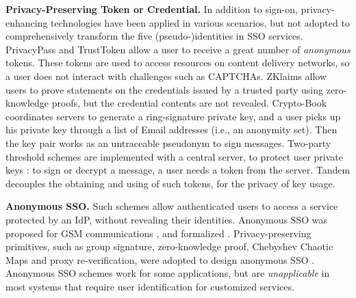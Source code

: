 \noindent\textbf{Privacy-Preserving Token or Credential.}
%
In addition to sign-on, privacy-enhancing technologies have been applied in various scenarios,
  but not adopted to comprehensively transform the five (pseudo-)identities in SSO services.
PrivacyPass and TrustToken \cite{privacypass,trusttoken} allow a user to receive a great number of \emph{anonymous} tokens.
 These tokens are used to access resources on content delivery networks,
    so a user does not interact with challenges such as CAPTCHAs.
ZKlaims \cite{zklaim} allow users to prove statements on the credentials issued by a trusted party
    using zero-knowledge proofs,
        but the credential contents are not revealed.
Crypto-Book \cite{crypto-book} coordinates servers to generate a ring-signature private key,
 and a user picks up his private key through a list of Email addresses (i.e., an anonymity set).
 Then the key pair works as an untraceable pseudonym to sign messages.
Two-party threshold schemes are implemented with a central server,
    to protect user private keys \cite{mRSA,ss-rsa}:
    to sign or decrypt a message, a user needs a token from the server.
    Tandem \cite{tandem} decouples the obtaining and using of such tokens,
for the privacy of key usage.


\noindent\textbf{Anonymous SSO.}
Such schemes allow authenticated users to access a service protected by an IdP,
    without revealing their identities.
Anonymous SSO was proposed for GSM communications \cite{ElmuftiWRR08},
    and formalized \cite{WangWS13}.
Privacy-preserving primitives, such as group signature, zero-knowledge proof, Chebyshev Chaotic Maps and proxy re-verification,
     were adopted to design anonymous SSO \cite{WangWS13,HanCSTW18,Lee18,HanCSTWW20}.
Anonymous SSO schemes work for some applications,
    but are \emph{unapplicable} in most systems that require user identification for customized services.

